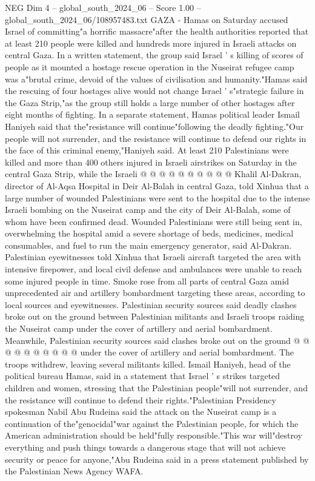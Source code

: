\begin{textsample}{NEG Dim 4 – global\_south\_2024\_06 – Score 1.00 – global\_south\_2024\_06/108957483.txt}  \label{ex:f4_neg_380}
GAZA - Hamas on Saturday accused Israel of committing"a horrific massacre"after the health authorities reported that at least 210 people were killed and hundreds more injured in Israeli attacks on central Gaza.
In a written statement, the group said Israel ' s killing of scores of people as it mounted a hostage rescue operation in the Nuseirat refugee camp was a"brutal crime, devoid of the values of civilisation and humanity."Hamas said the rescuing of four hostages alive would not change Israel ' s"strategic failure in the Gaza Strip,"as the group still holds a large number of other hostages after eight months of fighting.
In a separate statement, Hamas political leader Ismail Haniyeh said that the"resistance will continue"following the deadly fighting."Our people will not surrender, and the resistance will continue to defend our rights in the face of this criminal enemy,"Haniyeh said.
At least 210 Palestinians were killed and more than 400 others injured in Israeli airstrikes on Saturday in the central Gaza Strip, while the Israeli @ @ @ @ @ @ @ @ @ @ Khalil Al-Dakran, director of Al-Aqsa Hospital in Deir Al-Balah in central Gaza, told Xinhua that a large number of wounded Palestinians were sent to the hospital due to the intense Israeli bombing on the Nuseirat camp and the city of Deir Al-Balah, some of whom have been confirmed dead.
Wounded Palestinians were still being sent in, overwhelming the hospital amid a severe shortage of beds, medicines, medical consumables, and fuel to run the main emergency generator, said Al-Dakran.
Palestinian eyewitnesses told Xinhua that Israeli aircraft targeted the area with intensive firepower, and local civil defense and ambulances were unable to reach some injured people in time.
Smoke rose from all parts of central Gaza amid unprecedented air and artillery bombardment targeting these areas, according to local sources and eyewitnesses.
Palestinian security sources said deadly clashes broke out on the ground between Palestinian militants and Israeli troops raiding the Nuseirat camp under the cover of artillery and aerial bombardment.
Meanwhile, Palestinian security sources said clashes broke out on the ground @ @ @ @ @ @ @ @ @ @ under the cover of artillery and aerial bombardment.
The troops withdrew, leaving several militants killed.
Ismail Haniyeh, head of the political bureau Hamas, said in a statement that Israel ' s strikes targeted children and women, stressing that the Palestinian people"will not surrender, and the resistance will continue to defend their rights."Palestinian Presidency spokesman Nabil Abu Rudeina said the attack on the Nuseirat camp is a continuation of the"genocidal"war against the Palestinian people, for which the American administration should be held"fully responsible."This war will"destroy everything and push things towards a dangerous stage that will not achieve security or peace for anyone,"Abu Rudeina said in a press statement published by the Palestinian News Agency WAFA.

\end{textsample}
